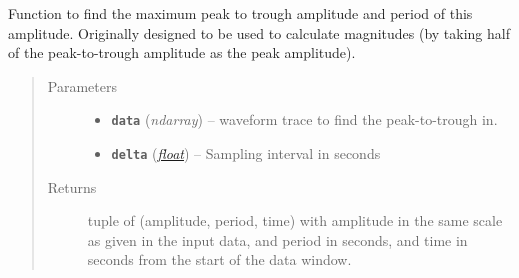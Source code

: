 \documentclass[a4paper,10pt,english]{sphinxmanual}
\begin{document}
\begin{fulllineitems}
\label{modules:mag_calc._max_p2t}
Function to find the maximum peak to trough amplitude and period of this
amplitude.  Originally designed to be used to calculate magnitudes (by
taking half of the peak-to-trough amplitude as the peak amplitude).
\begin{quote}\begin{description}
\item[{Parameters}] \leavevmode\begin{itemize}
\item {} 
\textbf{\texttt{data}} (\emph{ndarray}) -- waveform trace to find the peak-to-trough in.

\item {} 
\textbf{\texttt{delta}} (\href{https://docs.python.org/library/functions.html\#float}{\emph{float}}) -- Sampling interval in seconds

\end{itemize}

\item[{Returns}] \leavevmode
tuple of (amplitude, period, time) with amplitude in the same scale as
given in the input data, and period in seconds, and time in seconds
from the start of the data window.

\end{description}\end{quote}

\end{fulllineitems}

\end{document}
